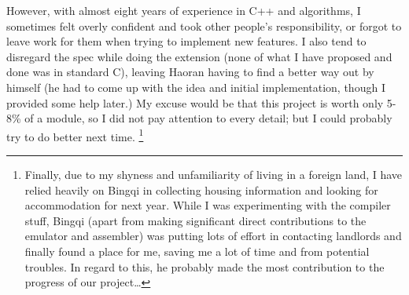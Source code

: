 \documentclass[11pt]{article}
\begin{document}
However, with almost eight years of experience in C++ and algorithms, I sometimes felt overly confident and took other people’s responsibility, or forgot to leave work for them when trying to implement new features. I also tend to disregard the spec while doing the extension (none of what I have proposed and done was in standard C), leaving Haoran having to find a better way out by himself (he had to come up with the idea and initial implementation, though I provided some help later.) My excuse would be that this project is worth only 5-8\% of a module, so I did not pay attention to every detail; but I could probably try to do better next time. \footnote{Finally, due to my shyness and unfamiliarity of living in a foreign land, I have relied heavily on Bingqi in collecting housing information and looking for accommodation for next year. While I was experimenting with the compiler stuff, Bingqi (apart from making significant direct contributions to the emulator and assembler) was putting lots of effort in contacting landlords and finally found a place for me, saving me a lot of time and from potential troubles. In regard to this, he probably made the most contribution to the progress of our project…}
\end{document}
